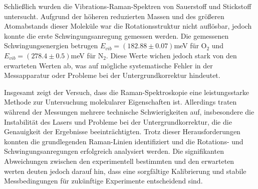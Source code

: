 Schließlich wurden die Vibrations-Raman-Spektren von Sauerstoff und Stickstoff untersucht. Aufgrund der h\"oheren reduzierten Massen und des gr\"o{\ss}eren Atomabstands dieser Molek\"ule war die Rotationsstruktur nicht aufl\"osbar, jedoch konnte die erste Schwingungsanregung gemessen werden. Die gemessenen Schwingungsenergien betrugen $E_{vib} =\left(182.88\pm0.07\right)$meV f\"ur O$_2$ und $E_{vib} =\left(278.4\pm0.5\right)$meV f\"ur N$_2$. Diese Werte wichen jedoch stark von den erwarteten Werten ab, was auf m\"ogliche systematische Fehler in der Messapparatur oder Probleme bei der Untergrundkorrektur hindeutet.

Insgesamt zeigt der Versuch, dass die Raman-Spektroskopie eine leistungsstarke Methode zur Untersuchung molekularer Eigenschaften ist. Allerdings traten w\"ahrend der Messungen mehrere technische Schwierigkeiten auf, insbesondere die Instabilit\"at des Lasers und Probleme bei der Untergrundkorrektur, die die Genauigkeit der Ergebnisse beeintr\"achtigten. Trotz dieser Herausforderungen konnten die grundlegenden Raman-Linien identifiziert und die Rotations- und Schwingungsanregungen erfolgreich analysiert werden. Die signifikanten Abweichungen zwischen den experimentell bestimmten und den erwarteten werten deuten jedoch darauf hin, dass eine sorgf\"altige Kalibrierung und stabile Messbedingungen f\"ur zuk\"unftige Experimente entscheidend sind.
